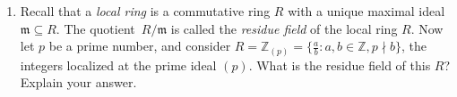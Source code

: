 \documentclass[11pt]{article}
\begin{document}
\begin{enumerate}
\item Recall that a \emph{local ring} is a commutative ring $R$ with a unique maximal ideal $\mathfrak{m} \subseteq R$. The quotient~$R/\mathfrak{m}$ is called the \emph{residue field} of the local ring $R$. Now let $p$ be a prime number, and consider $R=\mathbb{Z}_{(p)}=\{\frac{a}{b}\colon a,b\in \mathbb{Z}, p\nmid b\}$, the integers localized at the prime ideal $(p)$. What is the residue field of this $R$? Explain your answer.

\end{enumerate}
\end{document}
